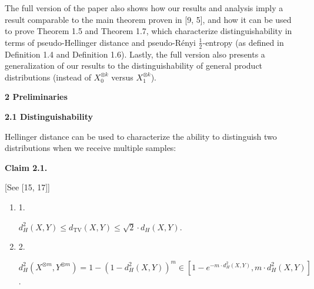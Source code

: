 \documentclass[10pt,a4paper]{article}
\begin{document}
The full version of the paper also shows how our results and analysis imply a result comparable to the main theorem proven in [9, 5], and how it can be used to prove Theorem 1.5 and Theorem 1.7, which characterize distinguishability in terms of pseudo-Hellinger distance and pseudo-Rényi $\frac{1}{2}$-entropy (as defined in Definition 1.4 and Definition 1.6). Lastly, the full version also presents a generalization of our results to the distinguishability of general product distributions (instead of $X_{0}^{\otimes k}$ versus $X_{1}^{\otimes k}$).\par






\par\medskip\noindent\textbf{
2 Preliminaries}\par




\par\medskip\noindent\textbf{
2.1 Distinguishability}\par




Hellinger distance can be used to characterize the ability to distinguish two distributions when we receive multiple samples:\par





\par\medskip\noindent\textbf{
Claim 2.1. 
}\par



[See [15, 17]]\par


\begin{enumerate}


\item[] 
1. 


$d_{H}^{2}(X,Y)\leq d_{\mathrm{TV}}(X,Y)\leq\sqrt{2}\cdot d_{H}(X,Y)$.\par





\item[] 
2. 


$d_{H}^{2}(X^{\otimes m},Y^{\otimes m})=1-(1-d_{H}^{2}(X,Y))^{m}\in[1-e^{-m\cdot d_{H}^{2}(X,Y)},m\cdot d_{H}^{2}(X,Y)]$.\par





\end{enumerate}
\end{document}
